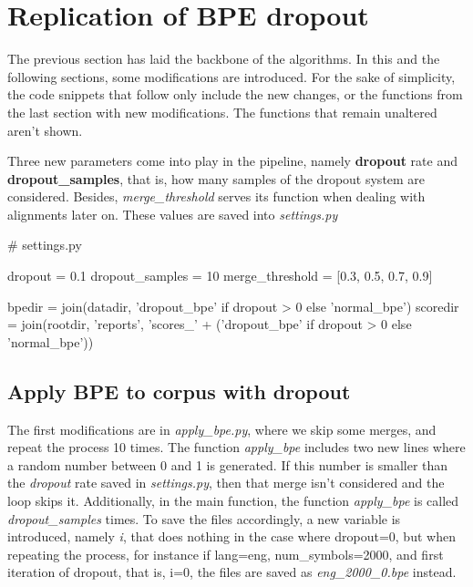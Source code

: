 \section{Replication of BPE dropout}

The previous section has laid the backbone of the algorithms. In this and the following sections, some modifications are introduced. For the sake of simplicity, the code snippets that follow only include the new changes, or the functions from the last section with new modifications. The functions that remain unaltered aren't shown.

Three new parameters come into play in the pipeline, namely \textbf{dropout} rate and \textbf{dropout\_samples}, that is, how many samples of the dropout system are considered. Besides, \emph{merge\_threshold} serves its function when dealing with alignments later on. These values are saved into \emph{settings.py}

\begin{python}
# settings.py

dropout = 0.1
dropout_samples = 10
merge_threshold = [0.3, 0.5, 0.7, 0.9]

bpedir = join(datadir, 'dropout_bpe' if dropout > 0 else 'normal_bpe')
scoredir = join(rootdir, 'reports', 'scores_' + ('dropout_bpe' if dropout > 0 else 'normal_bpe'))
\end{python}

\subsection{Apply BPE to corpus with dropout}

The first modifications are in \emph{apply\_bpe.py}, where we skip some merges, and repeat the process 10 times. The function \emph{apply\_bpe} includes two new lines where a random number between 0 and 1 is generated. If this number is smaller than the \emph{dropout} rate saved in \emph{settings.py}, then that merge isn't considered and the loop skips it. Additionally, in the main function, the function \emph{apply\_bpe} is called \emph{dropout\_samples} times. To save the files accordingly, a new variable is introduced, namely \emph{i}, that does nothing in the case where dropout=0, but when repeating the process, for instance if lang=eng, num\_symbols=2000, and first iteration of dropout, that is, i=0, the files are saved as \emph{eng\_2000\_0.bpe} instead.

